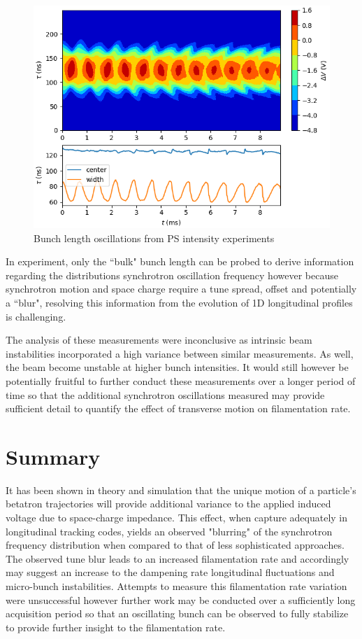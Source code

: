 \begin{figure}
    \centering
    \includegraphics{figs/injosc.14x144.dat.npy.png}
    \caption{Bunch length oscillations from PS intensity experiments}
\end{figure}

In experiment, only the ``bulk" bunch length can be probed to derive information regarding the distributions synchrotron oscillation frequency however because synchrotron motion and space charge require a tune spread, offset and potentially a ``blur", resolving this information from the evolution of 1D longitudinal profiles is challenging.

The analysis of these measurements were inconclusive as intrinsic beam instabilities incorporated a high variance between similar measurements. As well, the beam become unstable at higher bunch intensities. It would still however be potentially fruitful to further conduct these measurements over a longer period of time so that the additional synchrotron oscillations measured may provide sufficient detail to quantify the effect of transverse motion on filamentation rate.

\section{Summary}

It has been shown in theory and simulation that the unique motion of a particle's betatron trajectories will provide additional variance to the applied induced voltage due to space-charge impedance. This effect, when capture adequately in longitudinal tracking codes, yields an observed "blurring" of the synchrotron frequency distribution when compared to that of less sophisticated approaches. The observed tune blur leads to an increased filamentation rate and accordingly may suggest an increase to the dampening rate longitudinal fluctuations and micro-bunch instabilities. Attempts to measure this filamentation rate variation were unsuccessful however further work may be conducted over a sufficiently long acquisition period so that an oscillating bunch can be observed to fully stabilize to provide further insight to the filamentation rate.